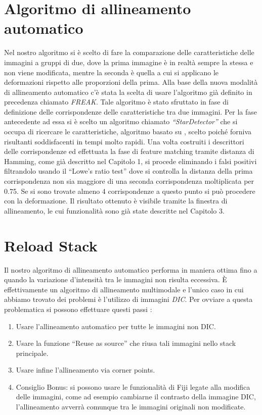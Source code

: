\section{Algoritmo di allineamento automatico}
\noindent Nel nostro algoritmo si è scelto di fare la comparazione delle caratteristiche delle immagini a gruppi di due, dove la prima immagine è in realtà sempre la stessa e non viene modificata, mentre la seconda è quella a cui si applicano le deformazioni rispetto alle proporzioni della prima. Alla base della nuova modalità di allineamento automatico c'è stata la scelta di usare l'algoritmo già definito in precedenza chiamato \textit{FREAK}. Tale algoritmo è stato sfruttato in fase di definizione delle corrispondenze delle caratteristiche tra due immagini. Per la fase antecedente ad essa si è scelto un algoritmo chiamato \textit{``StarDetector''} che si occupa di ricercare le caratteristiche, algoritmo basato su \cite{10.1007/978-3-540-88693-8_8}, scelto poiché forniva risultanti soddisfacenti in tempi molto rapidi. Una volta costruiti i descrittori delle corrispondenze ed effettuata la fase di feature matching tramite distanza di Hamming, come già descritto nel Capitolo 1, si procede eliminando i falsi positivi filtrandolo usando il ``Lowe's ratio test'' dove si controlla la distanza della prima corrispondenza non sia maggiore di una seconda corrispondenza moltiplicata per 0.75. Se si sono trovate almeno 4 corrispondenze a questo punto si può procedere con la deformazione. Il risultato ottenuto è visibile tramite la finestra di allineamento, le cui funzionalità sono già state descritte nel Capitolo 3. 

\section{Reload Stack}
\noindent Il nostro algoritmo di allineamento automatico performa in maniera ottima fino a quando la variazione d'intensità tra le immagini non risulta eccessiva. È effettivamente un algoritmo di allineamento multimodale e l'unico caso in cui abbiamo trovato dei problemi è l'utilizzo di immagini \textit{DIC}. Per ovviare a questa problematica si possono effettuare questi passi :
\begin{enumerate}
    \item Usare l'allineamento automatico per tutte le immagini non DIC\@.
    \item Usare la funzione ``Reuse as source'' che riusa tali immagini nello stack principale.
    \item Usare infine l'allineamento via corner points.
    \item Consiglio Bonus: si possono usare le funzionalità di Fiji legate alla modifica delle immagini, come ad esempio cambiarne il contrasto della immagine DIC, l'allineamento avverrà comunque tra le immagini originali non modificate.
\end{enumerate}